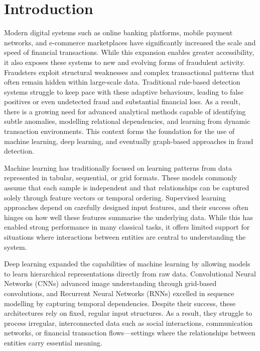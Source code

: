 
\chapter{Introduction}

Modern digital systems such as online banking platforms, mobile payment networks, and e-commerce marketplaces have significantly increased the scale and speed of financial transactions. While this expansion enables greater accessibility, it also exposes these systems to new and evolving forms of fraudulent activity. Fraudsters exploit structural weaknesses and complex transactional patterns that often remain hidden within large-scale data. Traditional rule-based detection systems struggle to keep pace with these adaptive behaviours, leading to false positives or even undetected fraud and substantial financial loss. As a result, there is a growing need for advanced analytical methods capable of identifying subtle anomalies, modelling relational dependencies, and learning from dynamic transaction environments. This context forms the foundation for the use of machine learning, deep learning, and eventually graph-based approaches in fraud detection.

Machine learning has traditionally focused on learning patterns from data represented in tabular, sequential, or grid formats. These models commonly assume that each sample is independent and that relationships can be captured solely through feature vectors or temporal ordering. Supervised learning approaches depend on carefully designed input features, and their success often hinges on how well these features summarise the underlying data. While this has enabled strong performance in many classical tasks, it offers limited support for situations where interactions between entities are central to understanding the system.

Deep learning expanded the capabilities of machine learning by allowing models to learn hierarchical representations directly from raw data. Convolutional Neural Networks (CNNs) advanced image understanding through grid-based convolutions, and Recurrent Neural Networks (RNNs) excelled in sequence modelling by capturing temporal dependencies. Despite their success, these architectures rely on fixed, regular input structures. As a result, they struggle to process irregular, interconnected data such as social interactions, communication networks, or financial transaction flows---settings where the relationships between entities carry essential meaning.

